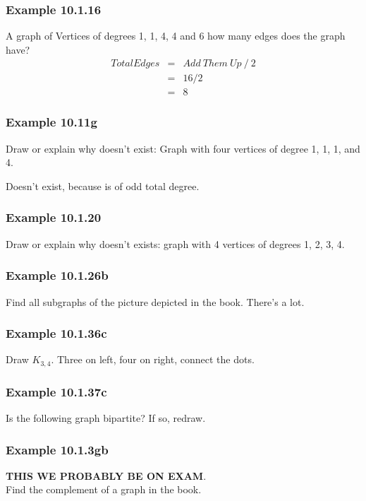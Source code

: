 \documentclass{article}
\begin{document}
\setcounter{section}{10}
\setcounter{subsection}{1}

\subsubsection{Example 10.1.16}
A graph of Vertices of degrees 1, 1, 4, 4 and 6 how many edges does the graph have?
\begin{eqnarray}
Total Edges & = & Add \ Them \ Up \ / \ 2 \\
& = & 16 /2 \\
& = & 8
\end{eqnarray}

\subsubsection{Example 10.11g} Draw or explain why doesn't exist: Graph with four vertices of degree 1, 1, 1, and 4.

\noindent
Doesn't exist, because is of odd total degree.

\subsubsection{Example 10.1.20}
Draw or explain why doesn't exists: graph with 4 vertices of degrees 1, 2, 3, 4.

\subsubsection{Example 10.1.26b}
Find all subgraphs of the picture depicted in the book. There's a lot.

\subsubsection{Example 10.1.36c}
Draw $K_{3,4}$. Three on left, four on right, connect the dots.

\subsubsection{Example 10.1.37c}
Is the following graph bipartite? If so, redraw.

\subsubsection{Example 10.1.3gb}
\textbf{THIS WE PROBABLY BE ON EXAM}. \\
Find the complement of a graph in the book.
\end{document}
